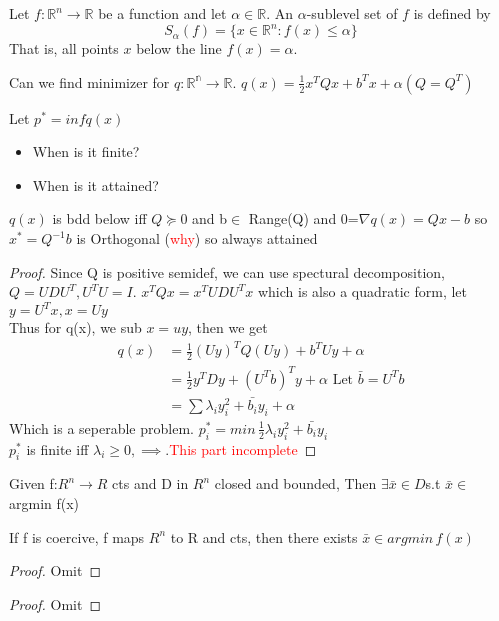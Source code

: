 \begin{definition}
  Let $f: \mathbb R^n \to \mathbb R$ be a function and let $\alpha \in \mathbb R$. An $\alpha$-sublevel set of $f$ is defined by $$S_\alpha(f) = \{x \in \mathbb R^n: f(x) \leq \alpha\}$$
  That is, all points $x$ below the line $f(x) = \alpha$.
\end{definition}

\begin{problem}
  Can we find minimizer for $q:\mathbb{R^n}\rightarrow \mathbb{R}$.
  $q(x)=\frac{1}{2}x^TQx+b^Tx+\alpha(Q=Q^T)$
  
  Let $p^*=inf q(x)$ 
  \begin{itemize}
    \item When is it finite?
    \item When is it attained?
  \end{itemize} 
  
\end{problem}

\begin{proposition}
   $q(x)$ is bdd below iff $Q\succeq 0$ and b$\in$ Range(Q) and 0=$\nabla q(x)=Qx-b$ so $x^*=Q^{-1}b$ is Orthogonal (\textcolor{red}{why}) so always attained


\end{proposition}
\begin{proof}
  Since Q is positive semidef, we can use spectural decomposition,
  $Q=UDU^T,U^TU=I$. $x^TQx=x^TUDU^Tx$ which is also a quadratic form, let $y=U^Tx,x=Uy$
  \\ Thus for q(x), we sub $x=uy$, then we get 
  \begin{align*}
    q(x) &= \frac{1}{2}(Uy)^TQ(Uy)+b^TUy+\alpha \\
    &= \frac{1}{2}y^TDy+(U^Tb)^Ty+\alpha \text{  Let }\bar{b}=U^Tb \\
    &= \sum\lambda_iy_i^2+\bar{b_i}y_i+\alpha
  \end{align*}
  Which is a seperable problem.
  $p_i^*=min\, \frac{1}{2}\lambda_iy_i^2+\bar{b_i}y_i$
  \\ $p_i^*$ is finite iff $\lambda_i \geq 0,\implies . $\textcolor{red}{This part incomplete}
\end{proof}

\begin{theorem}[Weierstrass]
  Given f:$R^n\rightarrow R$ cts and D in $R^n$ closed and bounded,
  Then $\exists\bar{x}\in D$s.t $\bar{x}\in$ argmin f(x)
\end{theorem}

\begin{proposition}
  If f is coercive, f maps $R^n$ to R and cts, then there exists $\bar{x}\in argmin\,f(x)$
\end{proposition}
\begin{proof}
  Omit
\end{proof}

\begin{theorem}
  
\end{theorem}
\begin{proof}
  Omit
\end{proof}